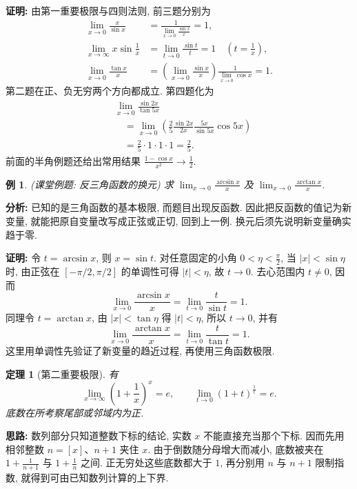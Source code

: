 \documentclass[UTF8,openany]{ctexbook}
\theoremstyle{chinesetextbook}
\newtheorem{example}{例}[section]
\newtheorem{theorem}{定理}[section]
\newenvironment{cnproof}{\par\indent\textbf{证明:} \ignorespaces}{\par}
\begin{document}
\begin{cnproof}
由第一重要极限与四则法则, 前三题分别为
\[
\begin{aligned}
\lim_{x\to0}\frac{x}{\sin x}&=\frac1{\displaystyle\lim_{x\to0}\frac{\sin x}x}=1,\\
\lim_{x\to\infty}x\sin\frac1x&=\lim_{t\to0}\frac{\sin t}t=1\quad\left(t=\frac1x\right),\\
\lim_{x\to0}\frac{\tan x}x&=\left(\lim_{x\to0}\frac{\sin x}x\right)\frac1{\displaystyle\lim_{x\to0}\cos x}=1.
\end{aligned}
\]
第二题在正、负无穷两个方向都成立. 第四题化为
\[
\begin{aligned}
&\lim_{x\to0}\frac{\sin2x}{\tan5x}\\
&\quad=\lim_{x\to0}\left(\frac25\frac{\sin2x}{2x}\frac{5x}{\sin5x}\cos5x\right)\\
&\quad=\frac25\cdot1\cdot1\cdot1=\frac25.
\end{aligned}
\]
前面的半角例题还给出常用结果 $\displaystyle\frac{1-\cos x}{x^2}\to\frac12$.
\end{cnproof}
\begin{example}
(课堂例题: 反三角函数的换元) 求 $\displaystyle\lim_{x\to0}\frac{\arcsin x}{x}$ 及 $\displaystyle\lim_{x\to0}\frac{\arctan x}{x}$.
\end{example}
\par\indent\textbf{分析:} 已知的是三角函数的基本极限, 而题目出现反函数. 因此把反函数的值记为新变量, 就能把原自变量改写成正弦或正切, 回到上一例. 换元后须先说明新变量确实趋于零.
\begin{cnproof}
令 $t=\arcsin x$, 则 $x=\sin t$. 对任意固定的小角 $\displaystyle0<\eta<\frac\pi2$, 当 $|x|<\sin\eta$ 时, 由正弦在 $[-\pi/2,\pi/2]$ 的单调性可得 $|t|<\eta$, 故 $t\to0$. 去心范围内 $t\ne0$, 因而
\[
\lim_{x\to0}\frac{\arcsin x}x=\lim_{t\to0}\frac t{\sin t}=1.
\]
同理令 $t=\arctan x$, 由 $|x|<\tan\eta$ 得 $|t|<\eta$, 所以 $t\to0$, 并有
\[
\lim_{x\to0}\frac{\arctan x}x=\lim_{t\to0}\frac t{\tan t}=1.
\]
这里用单调性先验证了新变量的趋近过程, 再使用三角函数极限.
\end{cnproof}
\begin{theorem}[第二重要极限]
有
\[
\lim_{x\to\infty}\left(1+\frac1x\right)^x=e,
\qquad
\lim_{t\to0}(1+t)^{\frac1t}=e.
\]
底数在所考察尾部或邻域内为正.
\end{theorem}
\par\indent\textbf{思路:} 数列部分只知道整数下标的结论, 实数 $x$ 不能直接充当那个下标. 因而先用相邻整数 $n=[x]$、$n+1$ 夹住 $x$. 由于倒数随分母增大而减小, 底数被夹在 $\displaystyle1+\frac1{n+1}$ 与 $\displaystyle1+\frac1n$ 之间. 正无穷处这些底数都大于 $1$, 再分别用 $n$ 与 $n+1$ 限制指数, 就得到可由已知数列计算的上下界.
\end{document}
